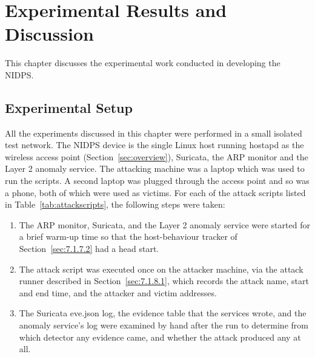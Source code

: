 \chapter{Experimental Results and Discussion}\label{chap:9}
\label{chap:experiments}

\noindent This chapter discusses the experimental work conducted in developing the NIDPS.

\section{Experimental Setup}\label{sec:9.1}

\noindent All the experiments discussed in this chapter were performed in a small isolated test network. The NIDPS device is the single Linux host running hostapd as the wireless access point (Section~\ref{sec:overview}), Suricata, the ARP monitor and the Layer 2 anomaly service. The attacking machine was a laptop which was used to run the scripts. A second laptop was plugged through the access point and so was a phone, both of which were used as victims. For each of the attack scripts listed in Table~\ref{tab:attackscripts}, the following steps were taken:
\begin{enumerate}
    \item The ARP monitor, Suricata, and the Layer 2 anomaly service were started for a brief warm-up time so that the host-behaviour tracker of Section~\ref{sec:7.1.7.2} had a head start.
    \item The attack script was executed once on the attacker machine, via the attack runner described in Section~\ref{sec:7.1.8.1}, which records the attack name, start and end time, and the attacker and victim addresses.
    \item The Suricata eve.json log, the evidence table that the services wrote, and the anomaly service's log were examined by hand after the run to determine from which detector any evidence came, and whether the attack produced any at all.
\end{enumerate}

